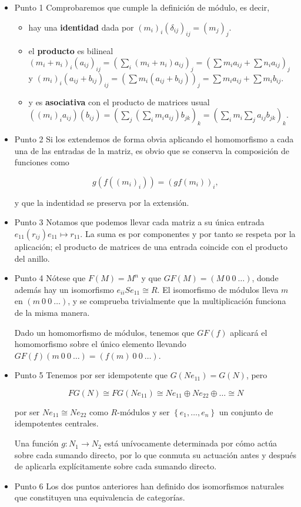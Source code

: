 \documentclass[11pt]{article}
\begin{document}
\begin{itemize}
\item Punto 1
\label{sec-7-4-8-1}
Comprobaremos que cumple la definición de módulo, es decir,

\begin{itemize}
\item hay una \textbf{identidad} dada por $(m_i)_i(\delta_{ij})_{ij} = (m_{j})_{j}$.
\item el \textbf{producto} es bilineal
$(m_i+n_i)_i(a_{ij})_{ij} = (\sum_i (m_i+n_i)a_{ij})_j = (\sum m_ia_{ij} + \sum n_ia_{ij})_j$ y
$(m_i)_i(a_{ij}+b_{ij})_{ij} = (\sum m_i(a_{ij}+b_{ij}))_j = \sum m_ia_{ij} + \sum m_ib_{ij}$.
\item y es \textbf{asociativa} con el producto de matrices usual
$((m_i)_ia_{ij})(b_{ij}) = (\sum_j (\sum_i m_ia_{ij})b_{jk})_{k} = (\sum_i m_i\sum_{j}a_{ij}b_{jk})_k$.
\end{itemize}

\item Punto 2
\label{sec-7-4-8-2}
Si los extendemos de forma obvia aplicando el homomorfismo a cada una de las
entradas de la matriz, es obvio que se conserva la composición de funciones
como

\[
g(f((m_{i})_i)) = (gf(m_i))_i,
\]

y que la indentidad se preserva por la extensión.

\item Punto 3
\label{sec-7-4-8-3}
Notamos que podemos llevar cada matriz a su única entrada $e_{11}(r_{ij})e_{11} \mapsto r_{11}$.
La suma es por componentes y por tanto se respeta por la aplicación; el
producto de matrices de una entrada coincide con el producto del anillo.

\item Punto 4
\label{sec-7-4-8-4}
Nótese que $F(M) = M^n$ y que $GF(M) = (M\ 0\ 0\ \dots )$, donde además hay un
isomorfismo $e_{ii}Se_{11} \cong R$. El isomorfismo de módulos lleva $m$ en $(m\ 0\ 0\ \dots)$,
y se comprueba trivialmente que la multiplicación funciona de la misma
manera.

Dado un homomorfismo de módulos, tenemos que $GF(f)$ aplicará el homomorfismo
sobre el único elemento llevando $GF(f)(m\ 0\ 0\ \dots) = (f(m)\ 0\ 0\ \dots)$.

\item Punto 5
\label{sec-7-4-8-5}
Tenemos por ser idempotente que $G(Ne_{11}) = G(N)$, pero 

\[FG(N) \cong FG(Ne_{11}) \cong Ne_{11} \oplus Ne_{22} \oplus \dots \cong N\]

por ser $Ne_{11}\cong Ne_{22}$ como $R\text{-módulos}$ y ser $\left\{ e_{1},\dots,e_{n} \right\}$ un conjunto de
idempotentes centrales.

Una función $g\colon N_1 \to N_2$ está unívocamente determinada por cómo actúa
sobre cada sumando directo, por lo que conmuta su actuación antes y
después de aplicarla explícitamente sobre cada sumando directo.

\item Punto 6
\label{sec-7-4-8-6}
Los dos puntos anteriores han definido dos isomorfismos naturales
que constituyen una equivalencia de categorías.
\end{itemize}
\end{document}

